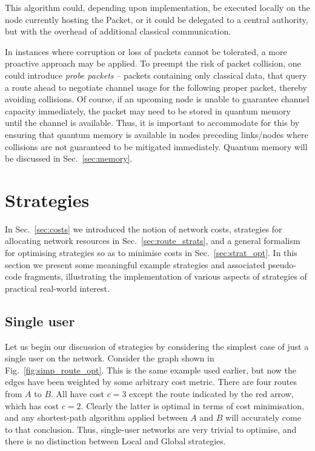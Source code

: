 \documentclass[aps,rmp,twocolumn,amsmath,amssymb,nofootinbib,superscriptaddress,longbibliography,floatfix]{revtex4-1}
\begin{document}
This algorithm could, depending upon implementation, be executed locally on the node currently hosting the {\sc Packet}, or it could be delegated to a central authority, but with the overhead of additional classical communication.

In instances where corruption or loss of packets cannot be tolerated, a more proactive approach may be applied. To preempt the risk of packet collision, one could introduce \emph{probe packets} -- packets containing only classical data, that query a route ahead to negotiate channel usage for the following proper packet, thereby avoiding collisions. Of course, if an upcoming node is unable to guarantee channel capacity immediately, the packet may need to be stored in quantum memory until the channel is available. Thus, it is important to accommodate for this by ensuring that quantum memory is available in nodes preceding links/nodes where collisions are not guaranteed to be mitigated immediately. Quantum memory will be discussed in Sec.~\ref{sec:memory}.

%
%

\section{Strategies} \label{sec:strategies}

In Sec.~\ref{sec:costs} we introduced the notion of network costs, strategies for allocating network resources in Sec.~\ref{sec:route_strats}, and a general formalism for optimising strategies so as to minimise costs in Sec.~\ref{sec:strat_opt}. In this section we present some meaningful example strategies and associated pseudo-code fragments, illustrating the implementation of various aspects of strategies of practical real-world interest.

%
%

\subsection{Single user} \label{sec:single_user_shortest}

Let us begin our discussion of strategies by considering the simplest case of just a single user on the network. Consider the graph shown in Fig.~\ref{fig:simp_route_opt}. This is the same example used earlier, but now the edges have been weighted by some arbitrary cost metric. There are four routes from $A$ to $B$. All have cost \mbox{$c=3$} except the route indicated by the red arrow, which has cost \mbox{$c=2$}. Clearly the latter is optimal in terms of cost minimisation, and any shortest-path algorithm applied between $A$ and $B$ will accurately come to that conclusion. Thus, single-user networks are very trivial to optimise, and there is no distinction between {\sc Local} and {\sc Global} strategies.
\end{document}
